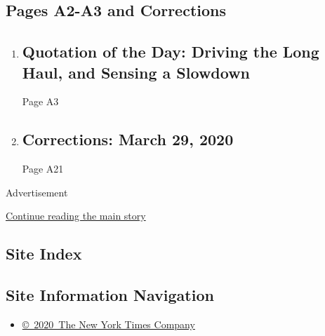 \hypertarget{pages-a2-a3-and-corrections}{%
\subsection{Pages A2-A3 and
Corrections}\label{pages-a2-a3-and-corrections}}

\begin{enumerate}
\def\labelenumi{\arabic{enumi}.}
\item
  \href{/2020/03/29/todayspaper/quotation-of-the-day-driving-the-long-haul-and-sensing-a-slowdown.html}{}

  \hypertarget{quotation-of-the-day-driving-the-long-haul-and-sensing-a-slowdown}{%
  \subsection{Quotation of the Day: Driving the Long Haul, and Sensing a
  Slowdown}\label{quotation-of-the-day-driving-the-long-haul-and-sensing-a-slowdown}}

  Page A3
\item
  \href{/2020/03/29/pageoneplus/corrections-march-29-2020.html}{}

  \hypertarget{corrections-march-29-2020}{%
  \subsection{Corrections: March 29,
  2020}\label{corrections-march-29-2020}}

  Page A21
\end{enumerate}

Advertisement

\protect\hyperlink{after-mid9}{Continue reading the main story}

\hypertarget{site-index}{%
\subsection{Site Index}\label{site-index}}

\hypertarget{site-information-navigation}{%
\subsection{Site Information
Navigation}\label{site-information-navigation}}

\begin{itemize}
\tightlist
\item
  \href{https://help.nytimes3xbfgragh.onion/hc/en-us/articles/115014792127-Copyright-notice}{©~2020~The
  New York Times Company}
\end{itemize}


